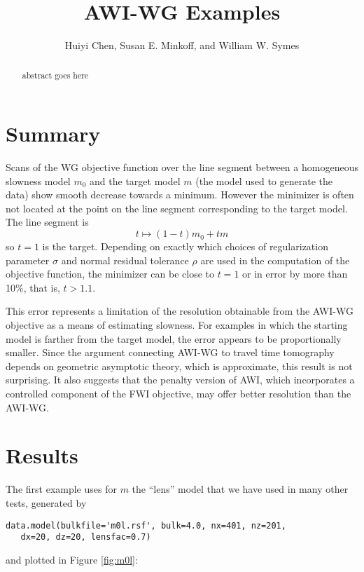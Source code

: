 \title{AWI-WG Examples}
\author{Huiyi Chen, Susan E. Minkoff, and William W. Symes}



\maketitle
\parskip 12pt

\begin{abstract}
abstract goes here
\end{abstract}
\setlength{\parindent}{0cm}

\section{Summary}
Scans of the WG objective function over the line segment between a homogeneous slowness model $m_0$ and the target model $m$  (the model used to generate the data) show smooth decrease towards a minimum. However the minimizer is often not located at the point on the line segment corresponding to the target model. The line segment is
$$ t \mapsto (1-t)m_0 + t m $$
so $t=1$ is the target.  Depending on exactly which choices of regularization parameter $\sigma$ and normal residual tolerance $\rho$ are used in the computation of the objective function, the minimizer can be close to $t=1$ or in error by more than 10\%, that is, $t > 1.1$.

This error represents a limitation of the resolution obtainable from the AWI-WG objective as a means of estimating slowness. For examples in which the starting model is farther from the target model, the error appears to be proportionally smaller. Since the argument connecting AWI-WG to travel time tomography depends on geometric asymptotic theory, which is approximate, this result is not surprising. It also suggests that the penalty version of AWI, which incorporates a controlled component of the FWI objective, may offer better resolution than the AWI-WG.

\section{Results}


The first example uses for $m$ the ``lens'' model that we have used in many other tests, generated by
\begin{verbatim}
data.model(bulkfile='m0l.rsf', bulk=4.0, nx=401, nz=201,
   dx=20, dz=20, lensfac=0.7)
\end{verbatim}
and plotted in Figure \ref{fig:m0l}:

